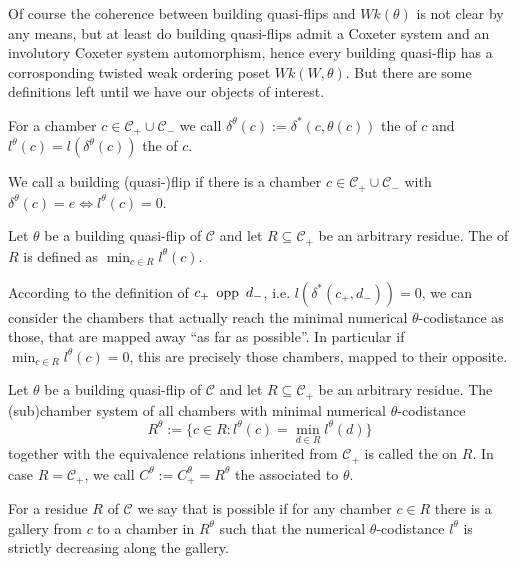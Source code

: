 Of course the coherence between building quasi-flips and $Wk(\theta)$ is not clear by any means, but at least do building quasi-flips admit a Coxeter system and an involutory Coxeter system automorphism, hence every building quasi-flip has a corrosponding twisted weak ordering poset $Wk(W,\theta)$. But there are some definitions left until we have our objects of interest.

\begin{defi}
	For a chamber $c \in \mathcal C_+ \cup \mathcal C_-$ we call $\delta^\theta(c) := \delta^*(c,\theta(c))$ the  of $c$ and $l^\theta(c) = l(\delta^\theta(c))$ the  of $c$.
\end{defi}

\begin{defi}
	We call a building (quasi-)flip  if there is a chamber $c \in \mathcal{C}_+ \cup \mathcal{C}_-$ with $\delta^{\theta}(c) = e \iff l^{\theta}(c) = 0$.
\end{defi}

\begin{defi}
	Let $\theta$ be a building quasi-flip of $\mathcal C$ and let $R \subseteq \mathcal C_+$ be an arbitrary residue. The  of $R$ is defined as $\min_{c \in R} l^{\theta}(c)$.
\end{defi}

According to the definition of $c_+ \opp d_-$, i.e. $l(\delta^*(c_+,d_-)) = 0$, we can consider the chambers that actually reach the minimal numerical $\theta$-codistance as those, that are mapped away ``as far as possible''. In particular if $\min_{c \in R} l^{\theta}(c) = 0$, this are precisely those chambers, mapped to their opposite.

\begin{defi}
	Let $\theta$ be a building quasi-flip of $\mathcal C$ and let $R \subseteq \mathcal C_+$ be an arbitrary residue. The (sub)chamber system of all chambers with minimal numerical $\theta$-codistance
	$$ R^\theta := \{ c \in R : l^\theta(c) = \min_{d \in R} l^\theta(d) \} $$
	together with the equivalence relations inherited from $\mathcal C_+$ is called the  on $R$. In case $R = \mathcal C_+$, we call $C^\theta := C_+^\theta = R^\theta$ the  associated to $\theta$.
\end{defi}

\begin{defi}
	For a residue $R$ of $\mathcal{C}$ we say that  is possible if for any chamber $c \in R$ there is a gallery from $c$ to a chamber in $R^\theta$ such that the numerical $\theta$-codistance $l^\theta$ is strictly decreasing along the gallery.
\end{defi}

